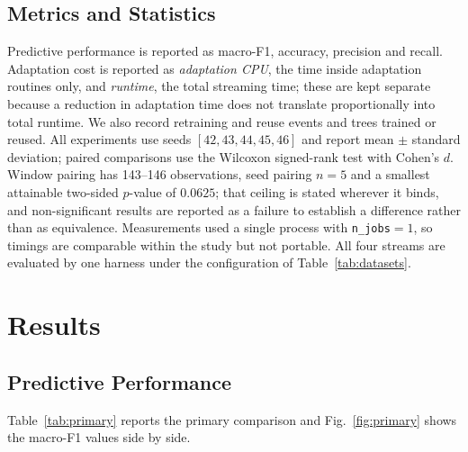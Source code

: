 \documentclass[conference]{IEEEtran}
\begin{document}
\subsection{Metrics and Statistics}
Predictive performance is reported as macro-F1, accuracy, precision and recall.
Adaptation cost is reported as \emph{adaptation CPU}, the time inside adaptation
routines only, and \emph{runtime}, the total streaming time; these are kept separate
because a reduction in adaptation time does not translate proportionally into total
runtime. We also record retraining and reuse events and trees trained or reused. All
experiments use seeds $[42, 43, 44, 45, 46]$ and report mean $\pm$ standard
deviation; paired comparisons use the Wilcoxon signed-rank test with Cohen's $d$.
Window pairing has 143--146 observations, seed pairing $n=5$ and a smallest attainable
two-sided $p$-value of $0.0625$; that ceiling is stated wherever it binds, and
non-significant results are reported as a failure to establish a difference rather
than as equivalence. Measurements used a single process with \texttt{n\_jobs}$=1$,
so timings are comparable within the study but not portable. All four streams are
evaluated by one harness under the configuration of Table~\ref{tab:datasets}.

\section{Results}

\subsection{Predictive Performance}
Table~\ref{tab:primary} reports the primary comparison and
Fig.~\ref{fig:primary} shows the macro-F1 values side by side.
\end{document}
